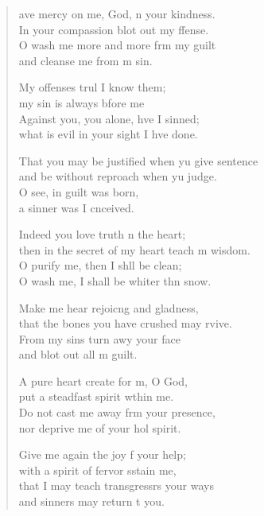 \settowidth{\versewidth}{That you may be justified when you give sentence *}
\begin{verse}%
  \begin{patverse}
ave mercy on me, God, \pointup{\i}n your kindness.\Med\\
In your compassion blot out my ffense.\\
O wash me more and more frm my guilt\Med\\
and cleanse me from m sin.

My offenses trul I know them;\Med\\
my sin is always bfore me\\
Against you, you alone, hve I sinned;\Med\\
what is evil in your sight I hve done.

That you may be justified when yu give sentence\Med\\
and be without reproach when yu judge.\\
O see, in guilt \pointup{\i} was born,\Med\\
a sinner was I cnceived.

Indeed you love truth \pointup{\i}n the heart;\Med\\
then in the secret of my heart teach m wisdom.\\
O purify me, then I shll be clean;\Med\\
O wash me, I shall be whiter thn snow.

Make me hear rejoic\pointup{\i}ng and gladness,\Med\\
that the bones you have crushed may rvive.\\
From my sins turn awy your face\Med\\
and blot out all m guilt.

A pure heart create for m, O God,\Med\\
put a steadfast spirit w\pointup{\i}thin me.\\
Do not cast me away frm your presence,\Med\\
nor deprive me of your hol spirit.

Give me again the joy f your help;\Med\\
with a spirit of fervor sstain me,\\
that I may teach transgressrs your ways\Med\\
and sinners may return t you.


\end{patverse}
\end{verse}
